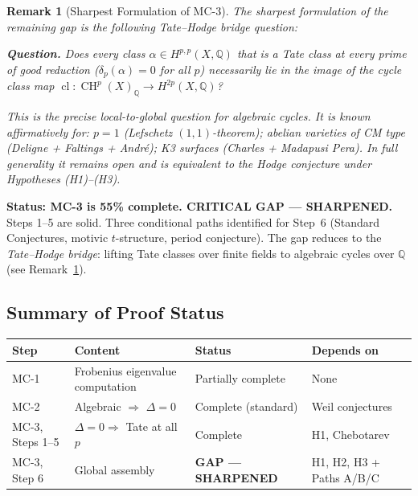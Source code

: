 \documentclass[11pt]{article}
\newtheorem{remark}[theorem]{Remark}
\theoremstyle{definition}
\DeclareMathOperator{\cl}{cl}
\DeclareMathOperator{\CH}{CH}
\begin{document}
\begin{remark}[Sharpest Formulation of MC-3]
\label{rem:sharpest-mc3}
The sharpest formulation of the remaining gap is the following
\emph{Tate--Hodge bridge question}:

\medskip
\noindent\textbf{Question.}
Does every class $\alpha \in H^{p,p}(X, \mathbb{Q})$ that is a Tate class at
every prime of good reduction ($\delta_p(\alpha) = 0$ for all $p$) necessarily
lie in the image of the cycle class map
$\cl : \CH^p(X)_{\mathbb{Q}} \to H^{2p}(X, \mathbb{Q})$?

\medskip
\noindent
This is the precise local-to-global question for algebraic cycles.  It is
known affirmatively for: $p = 1$ (Lefschetz $(1,1)$-theorem); abelian
varieties of CM type (Deligne + Faltings + Andr\'e); K3 surfaces
(Charles + Madapusi Pera).  In full generality it remains open and is
equivalent to the Hodge conjecture under Hypotheses (H1)--(H3).
\end{remark}

\noindent\textbf{Status: MC-3 is 55\% complete.  CRITICAL GAP --- SHARPENED.}
Steps 1--5 are solid.  Three conditional paths identified for Step~6 (Standard
Conjectures, motivic $t$-structure, period conjecture).  The gap reduces to the
\emph{Tate--Hodge bridge}: lifting Tate classes over finite fields to algebraic
cycles over $\mathbb{Q}$ (see Remark~\ref{rem:sharpest-mc3}).

\subsection{Summary of Proof Status}

\begin{center}
\begin{tabular}{llll}
\hline
\textbf{Step} & \textbf{Content} & \textbf{Status} & \textbf{Depends on} \\
\hline
MC-1 & Frobenius eigenvalue computation & Partially complete & None \\
MC-2 & Algebraic $\Rightarrow$ $\Delta = 0$ & Complete (standard) & Weil conjectures \\
MC-3, Steps 1--5 & $\Delta = 0 \Rightarrow$ Tate at all $p$ & Complete & H1, Chebotarev \\
MC-3, Step 6 & Global assembly & \textbf{GAP --- SHARPENED} & H1, H2, H3 + Paths A/B/C \\
\hline
\end{tabular}
\end{center}

\end{document}
